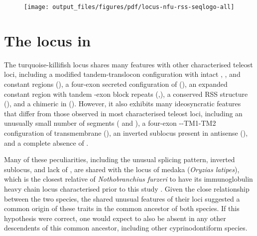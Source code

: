 	\begin{figure}
	\centering
	\texttt{[image: output\_files/figures/pdf/locus-nfu-rss-seqlogo-all]}
	\label{fig:nfu-rss-seqlogo-all}
	\end{figure}
	
\FloatBarrier
\clearpage

\section{The \igh{} locus in \xma}
\label{sec:xma-locus}
	
	The turquoise-killifish \igh{} locus shares many features with other characterised teleost loci, including a modified tandem-translocon configuration with intact \vh, \dh, \jh and constant regions (), a four-exon secreted configuration of  (), an expanded  constant region with tandem \cd{}-exon block repeats (,), a conserved RSS structure (), and a chimeric  in  (). However, it also exhibits many ideosyncratic features that differ from those observed in most characterised teleost loci, including an unusually small number of \vh segments ( and ), a four-exon --TM1-TM2 configuration of transmembrane  (), an inverted sublocus present in antisense (), and a complete absence of .
	
Many of these peculiarities, including the unusual  splicing pattern, inverted sublocus, and lack of , are shared with the \igh{} locus of medaka (\textit{Oryzias latipes}), which is the closest relative of \textit{Nothobranchius furzeri} to have its immunoglobulin heavy chain locus characterised prior to this study \parencite{magadan2011medaka}. Given the close relationship between the two species, the shared unusual features of their \igh{} loci suggested a common origin of these traits  in the common ancestor of both species. If this hypothesis were correct, one would expect  to also be absent in any other descendents of this common ancestor, including other cyprinodontiform species.

